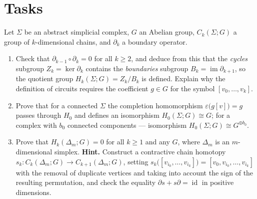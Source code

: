\documentclass[a4paper,12pt]{report}
\begin{document}
\section*{Tasks}

\begin{task}
Let $\Sigma$ be an abstract simplicial complex, $G$ an Abelian group, $C_k(\Sigma; G)$ a group of $k$-dimensional chains, and $\partial_k$ a boundary operator.
\begin{enumerate}[label=\textup{(\alph*)}]
\item Check that $\partial_{k-1} \circ \partial_k = 0$ for all $k \ge 2$, and deduce from this that the \emph{cycles} subgroup $Z_k = \ker \partial_k$ contains the \emph{boundaries} subgroup $B_k = \operatorname{im} \partial_{k+1}$, so the quotient group $H_k(\Sigma; G) = Z_k / B_k$ is defined. Explain why the definition of circuits requires the coefficient $g \in G$ for the symbol $[v_0, \dots, v_k]$.
\item Prove that for a connected $\Sigma$ the completion homomorphism $\varepsilon\bigl(g[v]\bigr) = g$ passes through $H_0$ and defines an isomorphism $H_0(\Sigma; G) \cong G$\textup{;} for a complex with $b_0$ connected components --- isomorphism $H_0(\Sigma; G) \cong G^{\oplus b_0}$.
\item Prove that $H_k(\Delta_m; G) = 0$ for all $k \ge 1$ and any $G$, where $\Delta_m$ is an $m$-dimensional simplex. \textbf{Hint.} Construct a contractive chain homotopy $s_k \colon C_k(\Delta_m; G) \to C_{k+1}(\Delta_m; G)$, setting $s_k\bigl([v_{i_0}, \dots, v_{i_k}]\bigr) = [v_0, v_{i_0}, \dots, v_{i_k}]$ with the removal of duplicate vertices and taking into account the sign of the resulting permutation, and check the equality $\partial s + s \partial = \operatorname{id}$ in positive dimensions.
\end{enumerate}
\end{task}
\end{document}
